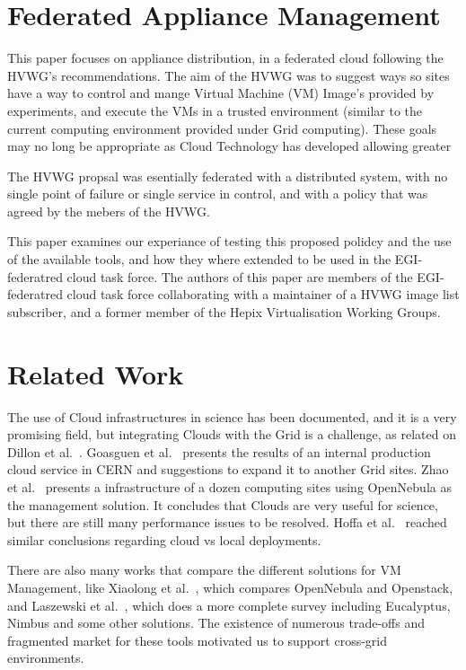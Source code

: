 \documentclass{llncs_Ibergrid2013}
\begin{document}
\section{Federated Appliance Management}
\label{sect-fedimagemanagement}

This paper focuses on appliance distribution, in a federated cloud following the HVWG's recommendations. The aim of the HVWG was to suggest ways so sites have a way to control and mange Virtual Machine (VM) Image's provided by experiments, and execute the VMs in a trusted environment (similar to the current computing environment provided under Grid computing). These goals may no long be appropriate as Cloud Technology has developed allowing greater

The HVWG propsal was esentially federated with a distributed system, with no single point of failure or single service in control, and with a policy that was agreed by the mebers of the HVWG.

This paper examines our experiance of testing this proposed polidcy and the use of the available tools, and how they where extended to be used in the EGI-federatred cloud task force. The authors of this paper are members of the EGI-federatred cloud task force collaborating with a maintainer of a HVWG image list subscriber, and a former member of the Hepix Virtualisation Working Groups.

\section{Related Work}
\label{sect-relatedwork}
The use of Cloud infrastructures in science has been documented, and it is a very promising field, but integrating Clouds with the Grid is a challenge, as related on Dillon et al.~\cite{Dillon2010}. Goasguen et al.~\cite{Goasguen2012} presents the results of an internal production cloud service in CERN and suggestions to expand it to another Grid sites. Zhao et al.~\cite{Zhao2012} presents a infrastructure of a dozen computing sites using OpenNebula as the management solution. It concludes that Clouds are very useful for science, but there are still many performance issues to be resolved. Hoffa et al.~\cite{Hoffa2008} reached similar conclusions regarding cloud vs local deployments.

There are also many works that compare the different solutions for VM Management, like Xiaolong et al.~\cite{Xiaolong2012}, which compares OpenNebula and Openstack, and Laszewski et al.~\cite{Laszewski2012}, which does a more complete survey including Eucalyptus, Nimbus and some other solutions. The existence of numerous trade-offs and fragmented market for these tools motivated us to support cross-grid environments.
\end{document}
